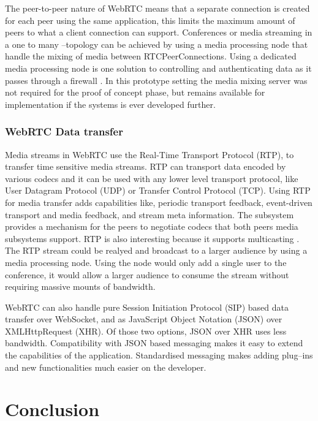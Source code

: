 \documentclass[english,12pt,a4paper,dvips]{article}
\begin{document}
The peer-to-peer nature of WebRTC means that a separate connection is created for each peer using the same application, this limits the maximum amount of peers to what a client connection can support. Conferences or media streaming in a one to many --topology can be achieved by using a media processing node that handle the mixing of media between RTCPeerConnections. \cite{Jennings} Using a dedicated media processing node is one solution to controlling and authenticating data as it passes through a firewall \cite{Johnston}. In this prototype setting the media mixing server was not required for the proof of concept phase, but remains available for implementation if the systems is ever developed further. 

\subsubsection{WebRTC Data transfer}

Media streams in WebRTC use the Real-Time Transport Protocol (RTP), to transfer time sensitive media streams. RTP can transport data encoded by various codecs and it can be used with any lower level transport protocol, like User Datagram Protocol (UDP) or Transfer Control Protocol (TCP). Using RTP for media transfer adds capabilities like, periodic transport feedback, event-driven transport and media feedback, and stream meta information. The subsystem provides a mechanism for the peers to negotiate codecs that both peers media subsystems support. \cite{Jennings} \cite{Johnston} \cite{Frederick} RTP is also interesting because it supports multicasting \cite{Frederick}. The RTP stream could be realyed and broadcast to a larger audience by using a media processing node. Using the node would only add a single user to the conference, it would allow a larger audience to consume the stream without requiring massive mounts of bandwidth.

WebRTC can also handle pure Session Initiation Protocol (SIP) based data transfer over WebSocket, and as JavaScript Object Notation (JSON) over XMLHttpRequest (XHR). Of those two options, JSON over XHR uses less bandwidth. \cite{Adeyeye} Compatibility with JSON based messaging makes it easy to extend the capabilities of the application. Standardised messaging makes adding plug--ins and new functionalities much easier on the developer.


\clearpage


\section{Conclusion}
\end{document}
